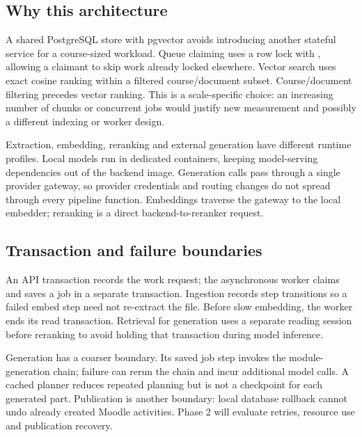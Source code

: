 \subsection{Why this architecture}
A shared PostgreSQL store with pgvector\citep{pgvector} avoids introducing another stateful service for a course-sized workload. Queue claiming uses a row lock with \citep{pgselect}, allowing a claimant to skip work already locked elsewhere. Vector search uses exact cosine ranking within a filtered course/document subset. Course/document filtering precedes vector ranking. This is a scale-specific choice: an increasing number of chunks or concurrent jobs would justify new measurement and possibly a different indexing or worker design.

Extraction, embedding, reranking and external generation have different runtime profiles. Local models run in dedicated containers, keeping model-serving dependencies out of the backend image. Generation calls pass through a single provider gateway, so provider credentials and routing changes do not spread through every pipeline function. Embeddings traverse the gateway to the local embedder; reranking is a direct backend-to-reranker request.
\subsection{Transaction and failure boundaries}
An API transaction records the work request; the asynchronous worker claims and saves a job in a separate transaction. Ingestion records step transitions so a failed embed step need not re-extract the file. Before slow embedding, the worker ends its read transaction. Retrieval for generation uses a separate reading session before reranking to avoid holding that transaction during model inference.

Generation has a coarser boundary. Its saved job step invokes the module-generation chain; failure can rerun the chain and incur additional model calls. A cached planner reduces repeated planning but is not a checkpoint for each generated part. Publication is another boundary: local database rollback cannot undo already created Moodle activities. Phase 2 will evaluate retries, resource use and publication recovery.
